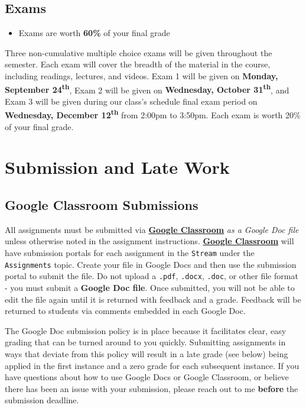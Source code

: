 \documentclass[]{book}
\newenvironment{rmdblock}[1]
  {\begin{shaded*}
  \begin{itemize}
  \renewcommand{\labelitemi}{
    \raisebox{-.7\height}[0pt][0pt]{
      {\setkeys{Gin}{width=3em,keepaspectratio}\texttt{[image: images/\#1]}}
    }
  }
  \item
  }
  {
  \end{itemize}
  \end{shaded*}
  }
\newenvironment{rmdtip}
  {\begin{rmdblock}{tip}}
  {\end{rmdblock}}
\theoremstyle{definition}
\theoremstyle{definition}
\theoremstyle{definition}
\theoremstyle{remark}
\begin{document}
\hypertarget{exams}{%
\subsection{Exams}\label{exams}}

\begin{rmdtip}
Exams are worth \textbf{60\%} of your final grade
\end{rmdtip}

Three non-cumulative multiple choice exams will be given throughout the
semester. Each exam will cover the breadth of the material in the
course, including readings, lectures, and videos. Exam 1 will be given
on \textbf{Monday, September 24\textsuperscript{th}}, Exam 2 will be
given on \textbf{Wednesday, October 31\textsuperscript{th}}, and Exam 3
will be given during our class's schedule final exam period on
\textbf{Wednesday, December 12\textsuperscript{th}} from 2:00pm to
3:50pm. Each exam is worth 20\% of your final grade.

\hypertarget{submission-and-late-work}{%
\section{Submission and Late Work}\label{submission-and-late-work}}

\hypertarget{google-classroom-submissions}{%
\subsection{Google Classroom
Submissions}\label{google-classroom-submissions}}

All assignments must be submitted via
\textbf{\href{https://classroom.google.com}{Google Classroom}} \emph{as
a Google Doc file} unless otherwise noted in the assignment
instructions. \textbf{\href{https://classroom.google.com}{Google
Classroom}} will have submission portals for each assignment in the
\texttt{Stream} under the \texttt{Assignments} topic. Create your file
in Google Docs and then use the submission portal to submit the file. Do
not upload a \texttt{.pdf}, \texttt{.docx}, \texttt{.doc}, or other file
format - you must submit a \textbf{Google Doc file}. Once submitted, you
will not be able to edit the file again until it is returned with
feedback and a grade. Feedback will be returned to students via comments
embedded in each Google Doc.

The Google Doc submission policy is in place because it facilitates
clear, easy grading that can be turned around to you quickly. Submitting
assignments in ways that deviate from this policy will result in a late
grade (see below) being applied in the first instance and a zero grade
for each subsequent instance. If you have questions about how to use
Google Docs or Google Classroom, or believe there has been an issue with
your submission, please reach out to me \textbf{before} the submission
deadline.
\end{document}
